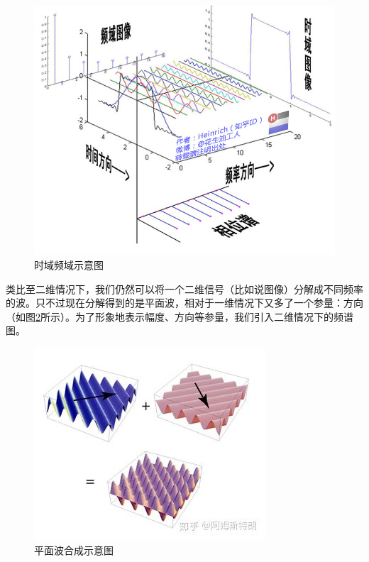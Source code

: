 \documentclass[UTF8]{ctexart}
\begin{document}
			\begin{figure}[htbp]
				\centering 
     			\includegraphics[scale=0.5]{time_vs_freq.jpg} 
				\caption{时域频域示意图} 
				\label{time_vs_freq}
			\end{figure}
            
            
            \indent 类比至二维情况下，我们仍然可以将一个二维信号（比如说图像）分解成不同频率的波。只不过现在分解得到的是平面波，相对于一维情况下又多了一个参量：方向（如图\ref{plane_wave}所示）。为了形象地表示幅度、方向等参量，我们引入二维情况下的频谱图。
            
            \begin{figure}[htbp]
            	\centering 
                \includegraphics[scale=0.7]{plane_wave.jpg} 
            	\caption{平面波合成示意图} 
            	\label{plane_wave}
            \end{figure}
            
\end{document}
